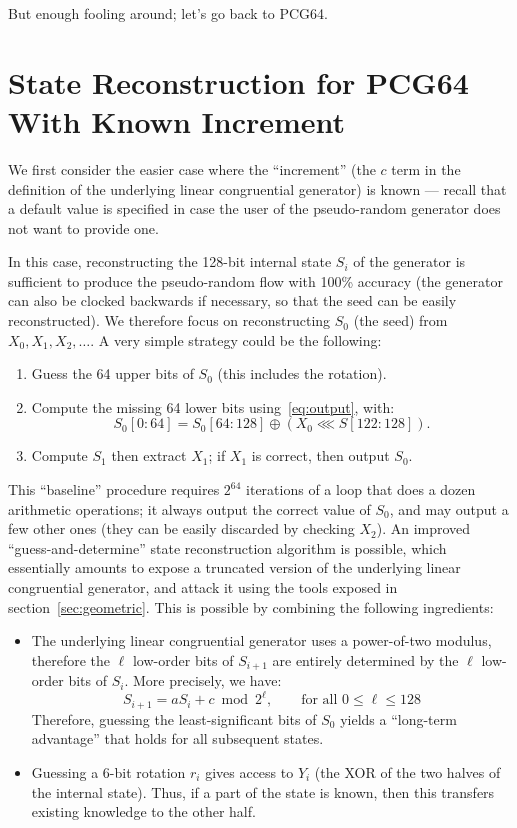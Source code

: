 \documentclass[submission,svgnames,journal=tosc]{iacrtrans}
\begin{document}
But enough fooling around; let's go back to \textsf{PCG64}.

\section{State Reconstruction for \textsf{PCG64} With Known Increment}
\label{sec:Cknown}

We first consider the easier case where the ``increment'' (the $c$ term in the
definition of the underlying linear congruential generator) is known --- recall
that a default value is specified in case the user of the pseudo-random
generator does not want to provide one.

In this case, reconstructing the 128-bit internal state $S_i$ of the generator
is sufficient to produce the pseudo-random flow with 100\% accuracy (the
generator can also be clocked backwards if necessary, so that the seed can be
easily reconstructed). We therefore focus on reconstructing $S_0$ (the seed)
from $X_0, X_1, X_2, \dots$. A very simple strategy could be the following:
\begin{enumerate}
\item Guess the 64 upper bits of $S_0$ (this includes the rotation).
\item Compute the missing 64 lower bits using~\eqref{eq:output}, with:
\[
   S_0[0:64] = S_0[64:128] \oplus (X_0  \lll S[122:128]).
\]
\item Compute $S_1$ then extract $X_1$; if $X_1$ is correct, then output $S_0$.
\end{enumerate}

This ``baseline'' procedure requires $2^{64}$ iterations of a loop that does a
dozen arithmetic operations; it always output the correct value of $S_0$, and
may output a few other ones (they can be easily discarded by checking $X_2$). An
improved ``guess-and-determine'' state reconstruction algorithm is possible,
which essentially amounts to expose a truncated version of the underlying linear
congruential generator, and attack it using the tools exposed in
section~\ref{sec:geometric}. This is possible by combining the following
ingredients:
\begin{itemize}
\item The underlying linear congruential generator uses a power-of-two modulus,
  therefore the $\ell$ low-order bits of $S_{i+1}$ are entirely determined by
  the $\ell$ low-order bits of $S_i$. More precisely, we have:
  \begin{equation}\label{eq:lcg}
    S_{i+1} = aS_i + c \bmod 2^\ell, \qquad \text{for all } 0 \leq \ell \leq 128
  \end{equation}
  Therefore, guessing the least-significant bits of $S_0$ yields a ``long-term
  advantage'' that holds for all subsequent states.

\item Guessing a 6-bit rotation $r_i$ gives access to $Y_i$ (the XOR of the two
  halves of the internal state). Thus, if a part of the state is known, then
  this transfers existing knowledge to the other half.
\end{itemize}
\end{document}
